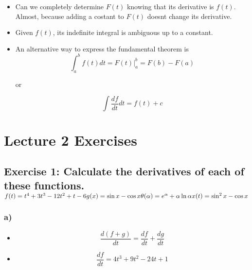 \documentclass[../main.tex]{subfiles}
\begin{document}
\begin{itemize}
    \item Can we completely determine $F(t)$ knowing that its derivative is
        $f(t)$. Almost, because adding a costant to $F(t)$ doesnt change its
        derivative.

    \item Given $f(t)$, its indefinite integral is ambiguous up to a constant.

    \item An alternative way to express the fundamental theorem is
        \begin{equation}
            \int_a^b f(t) dt = F(t)|_a^b = F(b) - F(a)
        \end{equation}

        or

        \begin{equation}
            \int \frac{df}{dt}dt = f(t) + c
        \end{equation}

\end{itemize}

\section{Lecture 2 Exercises}
\subsection*{Exercise 1: Calculate the derivatives of each of these functions.
    $\\f(t)=t^4+3 t^3-12 t^2+t-6 \\  g(x)=\sin x-\cos x \\ 
\theta(\alpha)=e^\alpha+\alpha \ln \alpha \\  x(t)=\sin ^2 x-\cos x $}

\subsubsection*{a)}

\begin{itemize}
    \item \begin{equation*}\frac{d(f+g)}{d t}=\frac{d f}{d t}+\frac{d g}{d t} \end{equation*} 
    \item \begin{equation*}\frac{d f}{d t}=4 t^3+9 t^2-24 t+1\end{equation*} 
\end{itemize}
\end{document}
